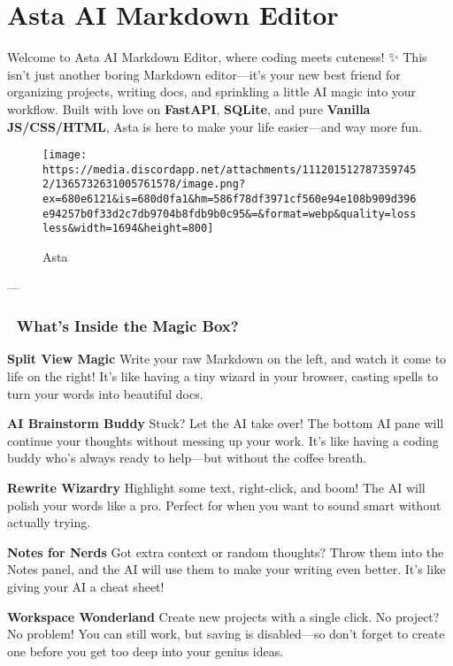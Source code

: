 \documentclass[12pt, a4paper, onecolumn, oneside]{report}
\begin{document}
\chapter{Asta AI Markdown Editor}

Welcome to Asta AI Markdown Editor, where coding meets cuteness! ✨ This isn’t just another boring Markdown editor—it’s your new best friend for organizing projects, writing docs, and sprinkling a little AI magic into your workflow. Built with love on \textbf{FastAPI}, \textbf{SQLite}, and pure \textbf{Vanilla JS/CSS/HTML}, Asta is here to make your life easier—and way more fun.

\begin{figure}[ht]
  \centering
  \texttt{[image: https://media.discordapp.net/attachments/1112015127873597452/1365732631005761578/image.png?ex=680e6121\&is=680d0fa1\&hm=586f78df3971cf560e94e108b909d396e94257b0f33d2c7db9704b8fdb9b0c95\&=\&format=webp\&quality=lossless\&width=1694\&height=800]}
  \caption{Asta}
  \label{fig:image}
\end{figure}


---

\subsection{🎉 What’s Inside the Magic Box?}

\textbf{Split View Magic}
Write your raw Markdown on the left, and watch it come to life on the right! It’s like having a tiny wizard in your browser, casting spells to turn your words into beautiful docs.

\textbf{AI Brainstorm Buddy}
Stuck? Let the AI take over! The bottom AI pane will continue your thoughts without messing up your work. It’s like having a coding buddy who’s always ready to help—but without the coffee breath.

\textbf{Rewrite Wizardry}
Highlight some text, right-click, and boom! The AI will polish your words like a pro. Perfect for when you want to sound smart without actually trying.

\textbf{Notes for Nerds}
Got extra context or random thoughts? Throw them into the Notes panel, and the AI will use them to make your writing even better. It’s like giving your AI a cheat sheet!

\textbf{Workspace Wonderland}
Create new projects with a single click. No project? No problem! You can still work, but saving is disabled—so don’t forget to create one before you get too deep into your genius ideas.
\end{document}
